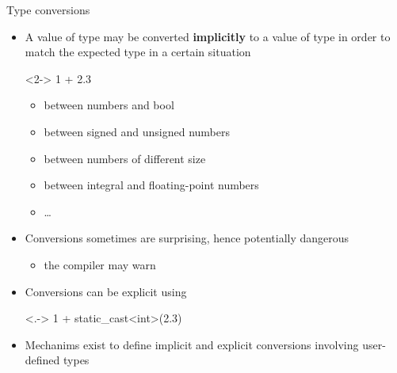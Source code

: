 \begin{frame}[fragile]{Type conversions}

    \begin{itemize}
    \item A value of type  may be converted \textbf{implicitly} to a
      value of type  in order to match the expected type in a certain
      situation
      \begin{codeblock}<2->{
1 + 2.3}\end{codeblock}
      \begin{itemize}[<3->]
      \item between numbers and bool
      \item between signed and unsigned numbers
      \item between numbers of different size
      \item between integral and floating-point numbers
      \item \ldots
      \end{itemize}

    \item<4-> Conversions sometimes are surprising, hence potentially dangerous
      \begin{itemize}
      \item the compiler may warn
      \end{itemize}
    \item<5-> Conversions can be explicit using 
      \begin{codeblock}<.->{
1 + static_cast<int>(2.3)}\end{codeblock}
    \item<6-> Mechanims exist to define implicit and explicit conversions
      involving user-defined types

    \end{itemize}

\end{frame}

